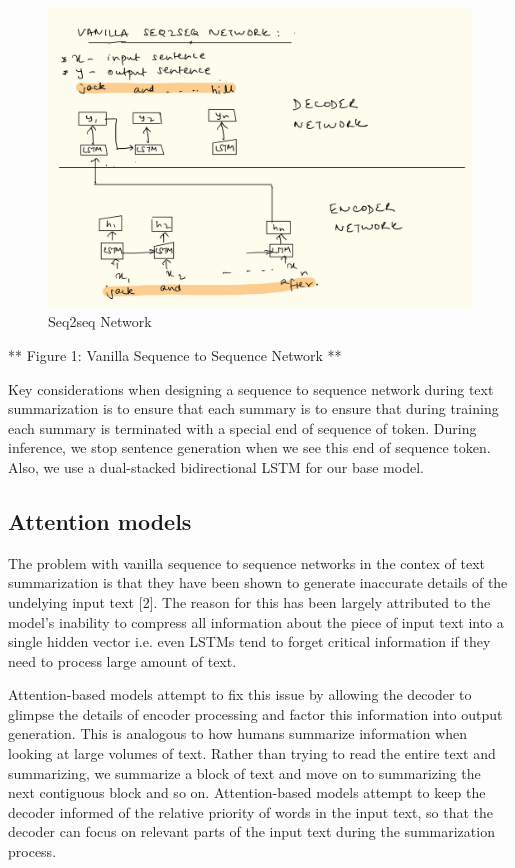 \documentclass[11pt]{article}
\makeatletter
\def\maxwidth{\ifdim\Gin@nat@width>\linewidth\linewidth
    \else\Gin@nat@width\fi}
\let\Oldincludegraphics\includegraphics
\renewcommand{\includegraphics}[1]{\Oldincludegraphics[width=.8\maxwidth]{#1}}
\makeatother
\begin{document}
\begin{figure}
\centering
\includegraphics{vanilla-seq2seq-network.png}
\caption{Seq2seq Network}
\end{figure}

 ** Figure 1: Vanilla Sequence to Sequence Network **

Key considerations when designing a sequence to sequence network during
text summarization is to ensure that each summary is to ensure that
during training each summary is terminated with a special end of
sequence of token. During inference, we stop sentence generation when we
see this end of sequence token. Also, we use a dual-stacked
bidirectional LSTM for our base model.

    \subsection{Attention models}\label{attention-models}

The problem with vanilla sequence to sequence networks in the contex of
text summarization is that they have been shown to generate inaccurate
details of the undelying input text {[}2{]}. The reason for this has
been largely attributed to the model's inability to compress all
information about the piece of input text into a single hidden vector
i.e. even LSTMs tend to forget critical information if they need to
process large amount of text.

Attention-based models attempt to fix this issue by allowing the decoder
to glimpse the details of encoder processing and factor this information
into output generation. This is analogous to how humans summarize
information when looking at large volumes of text. Rather than trying to
read the entire text and summarizing, we summarize a block of text and
move on to summarizing the next contiguous block and so on.
Attention-based models attempt to keep the decoder informed of the
relative priority of words in the input text, so that the decoder can
focus on relevant parts of the input text during the summarization
process.
\end{document}

